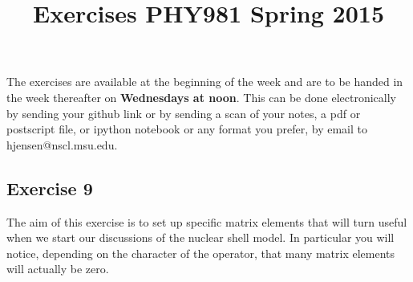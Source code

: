 \documentclass[prc]{revtex4}
\begin{document}
\title{Exercises PHY981 Spring 2015}
\maketitle
The exercises are available at the beginning of the 
week and are  to be handed in 
the week thereafter on {\bf Wednesdays at noon}. This can be done electronically by sending your github link or by sending a scan of your notes, a pdf or postscript file, or ipython notebook or any format you prefer,  by email to 
hjensen@nscl.msu.edu. 



\subsection*{Exercise 9}
The aim of this exercise is to set up specific matrix elements that will turn useful when we start our discussions of the nuclear shell model. In particular you will notice, depending on the character of the operator, that many matrix elements will actually be zero.
\end{document}

